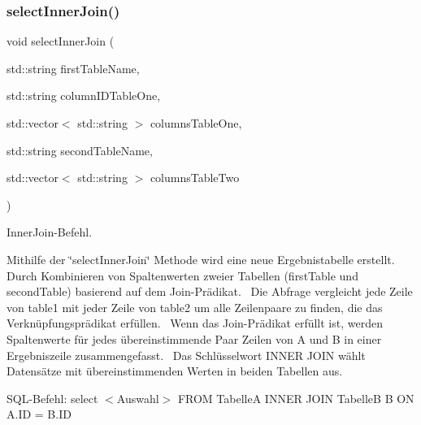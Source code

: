 \subsubsection{select\+Inner\+Join()}
{\footnotesize\ttfamily void select\+Inner\+Join (\begin{DoxyParamCaption}\item[{std\+::string}]{first\+Table\+Name,  }\item[{std\+::string}]{column\+I\+D\+Table\+One,  }\item[{std\+::vector$<$ std\+::string $>$}]{columns\+Table\+One,  }\item[{std\+::string}]{second\+Table\+Name,  }\item[{std\+::vector$<$ std\+::string $>$}]{columns\+Table\+Two }\end{DoxyParamCaption})}



Inner\+Join-\/\+Befehl. 

Mithilfe der \char`\"{}select\+Inner\+Join\char`\"{} Methode wird eine neue Ergebnistabelle erstellt.~\newline
 Durch Kombinieren von Spaltenwerten zweier Tabellen (first\+Table und second\+Table) basierend auf dem Join-\/\+Prädikat.~\newline
 Die Abfrage vergleicht jede Zeile von table1 mit jeder Zeile von table2 um alle Zeilenpaare zu finden, die das Verknüpfungsprädikat erfüllen.~\newline
 Wenn das Join-\/\+Prädikat erfüllt ist, werden Spaltenwerte für jedes übereinstimmende Paar Zeilen von A und B in einer Ergebniszeile zusammengefasst.~\newline
 Das Schlüsselwort I\+N\+N\+ER J\+O\+IN wählt Datensätze mit übereinstimmenden Werten in beiden Tabellen aus.~\newline


S\+Q\+L-\/\+Befehl\+: select $<$\+Auswahl$>$ F\+R\+OM TabelleA I\+N\+N\+ER J\+O\+IN TabelleB B ON A.\+ID = B.\+ID


